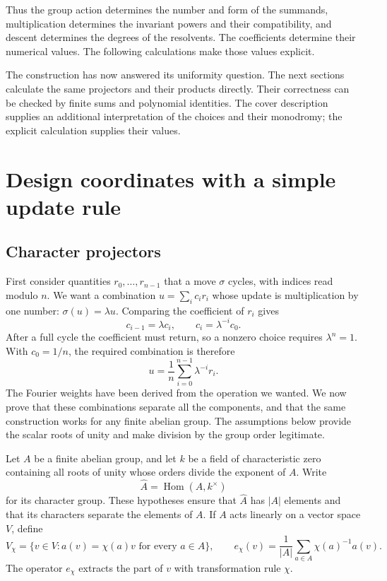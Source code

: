 \documentclass[11pt]{article}
\theoremstyle{remark}
\begin{document}
Thus the group action determines the number and form of the summands, multiplication determines the invariant powers and their compatibility, and descent determines the degrees of the resolvents. The coefficients determine their numerical values. The following calculations make those values explicit.

The construction has now answered its uniformity question. The next sections calculate the same projectors and their products directly. Their correctness can be checked by finite sums and polynomial identities. The cover description supplies an additional interpretation of the choices and their monodromy; the explicit calculation supplies their values.

\section{Design coordinates with a simple update rule}
\label{fourier:section}

\subsection{Character projectors}

First consider quantities \(r_0,\ldots,r_{n-1}\) that a move \(\sigma\) cycles, with indices read modulo \(n\). We want a combination \(u=\sum_i c_i r_i\) whose update is multiplication by one number: \(\sigma(u)=\lambda u\). Comparing the coefficient of \(r_i\) gives
\[
c_{i-1}=\lambda c_i,\qquad c_i=\lambda^{-i}c_0.
\]
After a full cycle the coefficient must return, so a nonzero choice requires \(\lambda^n=1\). With \(c_0=1/n\), the required combination is therefore
\[
u=\frac1n\sum_{i=0}^{n-1}\lambda^{-i}r_i.
\]
The Fourier weights have been derived from the operation we wanted. We now prove that these combinations separate all the components, and that the same construction works for any finite abelian group. The assumptions below provide the scalar roots of unity and make division by the group order legitimate.

Let \(A\) be a finite abelian group, and let \(k\) be a field of characteristic zero containing all roots of unity whose orders divide the exponent of \(A\). Write
\[
\widehat A=\operatorname{Hom}(A,k^\times)
\]
for its character group. These hypotheses ensure that \(\widehat A\) has \(|A|\) elements and that its characters separate the elements of \(A\). If \(A\) acts linearly on a vector space \(V\), define
\[
V_\chi=\{v\in V:a(v)=\chi(a)v\text{ for every }a\in A\},
\qquad
e_\chi(v)=\frac{1}{|A|}\sum_{a\in A}\chi(a)^{-1}a(v).
\]
The operator \(e_\chi\) extracts the part of \(v\) with transformation rule \(\chi\).
\end{document}
